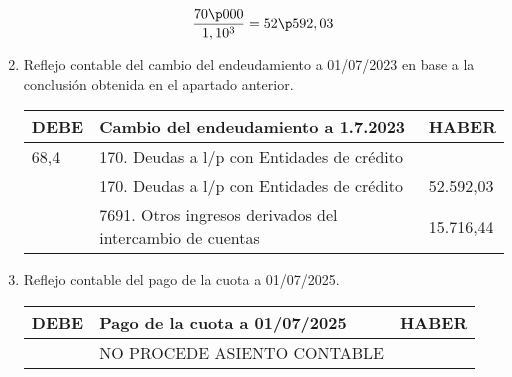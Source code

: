 \begin{enumerate}[label=\alph*)]
\begin{equation*}
    \frac{70\p000}{1,10^3} = 52\p592,03
\end{equation*}



\item Reflejo contable del cambio del endeudamiento a 01/07/2023 en base a la conclusión obtenida en el apartado anterior.

\begin{table}[H]
    \centering
    \begin{tabular}{|p{2cm}|p{8cm}|p{2cm}|}
    \hline
    \rowcolor{blue!30}
    \textbf{DEBE} & \textbf{Cambio del endeudamiento a 1.7.2023} & \textbf{HABER} \\
    \hline
    68\p308,4&  170. Deudas a l/p con Entidades de crédito& \\
    \hline
    & 170. Deudas a l/p con Entidades de crédito&52.592,03 \\
    \hline
    &  7691. Otros ingresos derivados del intercambio de cuentas& 15.716,44\\
    \hline
    \end{tabular}
\end{table}


\item Reflejo contable del pago de la cuota a 01/07/2025.
\begin{table}[H]
    \centering
    \begin{tabular}{|p{2cm}|p{8cm}|p{2cm}|}
    \hline
    \rowcolor{blue!30}
    \textbf{DEBE} & \textbf{Pago de la cuota a 01/07/2025} & \textbf{HABER} \\
    \hline
    & NO PROCEDE ASIENTO CONTABLE  &\\
    \hline
    \end{tabular}
\end{table}

\end{enumerate}






